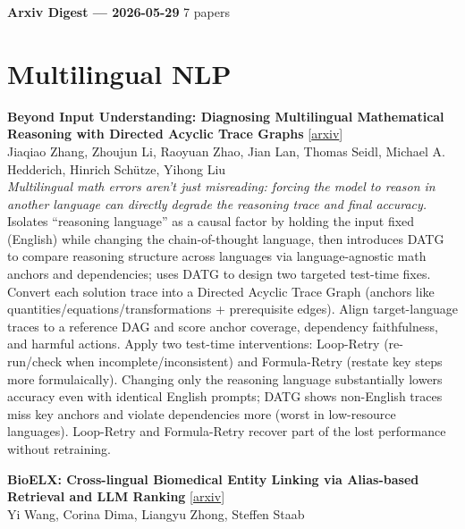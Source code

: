 \documentclass[12pt,letterpaper]{article}
\begin{document}
{\footnotesize\textbf{Arxiv Digest --- 2026-05-29} \hfill 7 papers}

\smallskip

\section*{Multilingual NLP}

{\small\textbf{Beyond Input Understanding: Diagnosing Multilingual Mathematical Reasoning with Directed Acyclic Trace Graphs}} {\scriptsize[\href{https://arxiv.org/abs/2605.27715}{arxiv}]}\\
{\scriptsize Jiaqiao Zhang, Zhoujun Li, Raoyuan Zhao, Jian Lan, Thomas Seidl, Michael A. Hedderich, Hinrich Sch\"utze, Yihong Liu}\\

{\small\textit{Multilingual math errors aren't just misreading: forcing the model to reason in another language can directly degrade the reasoning trace and final accuracy.}}\\[1pt]
{\footnotesize Isolates ``reasoning language'' as a causal factor by holding the input fixed (English) while changing the chain-of-thought language, then introduces DATG to compare reasoning structure across languages via language-agnostic math anchors and dependencies; uses DATG to design two targeted test-time fixes. Convert each solution trace into a Directed Acyclic Trace Graph (anchors like quantities/equations/transformations + prerequisite edges). Align target-language traces to a reference DAG and score anchor coverage, dependency faithfulness, and harmful actions. Apply two test-time interventions: Loop-Retry (re-run/check when incomplete/inconsistent) and Formula-Retry (restate key steps more formulaically). Changing only the reasoning language substantially lowers accuracy even with identical English prompts; DATG shows non-English traces miss key anchors and violate dependencies more (worst in low-resource languages). Loop-Retry and Formula-Retry recover part of the lost performance without retraining.}

\medskip

{\small\textbf{BioELX: Cross-lingual Biomedical Entity Linking via Alias-based Retrieval and LLM Ranking}} {\scriptsize[\href{https://arxiv.org/abs/2605.27380}{arxiv}]}\\
{\scriptsize Yi Wang, Corina Dima, Liangyu Zhong, Steffen Staab}\\
\end{document}
